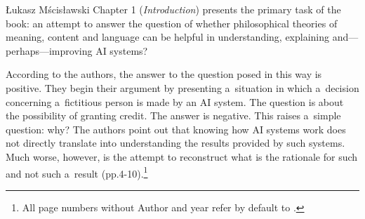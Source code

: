\begin{newrevengenv}{Łukasz Mścisławski}
Chapter 1 (\textit{Introduction}) presents the primary task of the book: an attempt to answer the question of whether philosophical theories of meaning, content and language can be helpful in understanding, explaining and---perhaps---improving AI systems?

According to the authors, the answer to the question posed in this way is positive. They begin their argument by presenting a~situation in which a~decision concerning a~fictitious person is made by an AI system. The question is about the possibility of granting credit. The answer is negative. This raises a~simple question: why? The authors point out that knowing how AI systems work does not directly translate into understanding the results provided by such systems. Much worse, however, is the attempt to reconstruct what is the rationale for such and not such a~result (pp.4-10).\footnote{All page numbers without Author and year refer by default to
\parencite[][]{cappelen_making_2021}.%
}
\end{newrevengenv}
